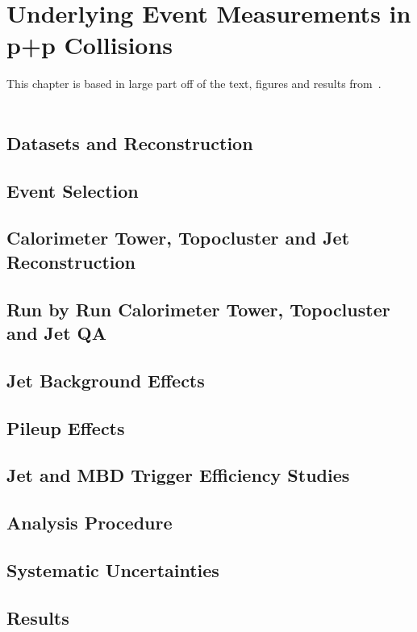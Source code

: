 \chapter{Underlying Event Measurements in p+p Collisions}
\label{ch:ue_in_pp}

\quad This chapter is based in large part off of the text, figures and results from~\cite{ppg10AN}.
\\
\\


\section{Datasets and Reconstruction}
\label{sec:ueinpp_datasets}


\section{Event Selection}
\label{sec:ueinpp_selection}


\section{Calorimeter Tower, Topocluster and Jet Reconstruction}
\label{sec:ueinpp_towerreco}


\section{Run by Run Calorimeter Tower, Topocluster and Jet QA}
\label{sec:ueinpp_runbyrunqa}


\section{Jet Background Effects} 
\label{sec:ueinpp_jetbackground}


\section{Pileup Effects}
\label{sec:ueinpp_pileup}


\section{Jet and MBD Trigger Efficiency Studies}
\label{sec:ueinpp_trigger_efficiency}


\section{Analysis Procedure}
\label{sec:ueinpp_analysis}


\section{Systematic Uncertainties}
\label{sec:ueinpp_systematic_uncertainties}

\clearpage

\section{Results}
\label{sec:ueinpp_results}
